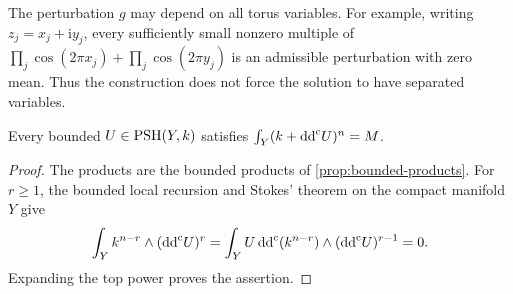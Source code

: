 The perturbation $g$ may depend on all torus variables. For example, writing $z_j=x_j+\mathrm i y_j$, every sufficiently small nonzero multiple of $\prod_j\cos(2\pi x_j)+\prod_j\cos(2\pi y_j)$ is an admissible perturbation with zero mean. Thus the construction does not force the solution to have separated variables.

\begin{lemma}\label{lem:cuspidal-bounded-mass}
Every bounded $U\in\mathrm{PSH}(Y,k)$ satisfies $\int_Y(k+\mathrm{dd}^{\mathrm{c}} U)^n=M$.
\end{lemma}
\begin{proof}
The products are the bounded products of \cref{prop:bounded-products}. For $r\geq1$, the bounded local recursion and Stokes' theorem on the compact manifold $Y$ give
\[
 \int_Y k^{n-r}\wedge(\mathrm{dd}^{\mathrm{c}} U)^r
     =\int_YU\,\mathrm{dd}^{\mathrm{c}}(k^{n-r})\wedge(\mathrm{dd}^{\mathrm{c}} U)^{r-1}=0.
\]
Expanding the top power proves the assertion.
\end{proof}

